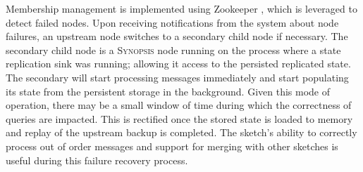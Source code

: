 Membership management is implemented using Zookeeper \cite{hunt2010zookeeper}, which is leveraged to detect failed nodes.
Upon receiving notifications from the system about node failures, an upstream node switches to a secondary child node if necessary. The secondary child node is a \textsc{Synopsis} node running on the process where a state replication sink was running; allowing it access to the persisted replicated state.
The secondary will start processing messages immediately and start populating its state from the persistent storage in the background.
Given this mode of operation, there may be a small window of time during which the correctness of queries are impacted.
This is rectified once the stored state is loaded to memory and replay of the upstream backup is completed.
The sketch's ability to correctly process out of order messages and support for merging with other sketches is useful during this failure recovery process.

